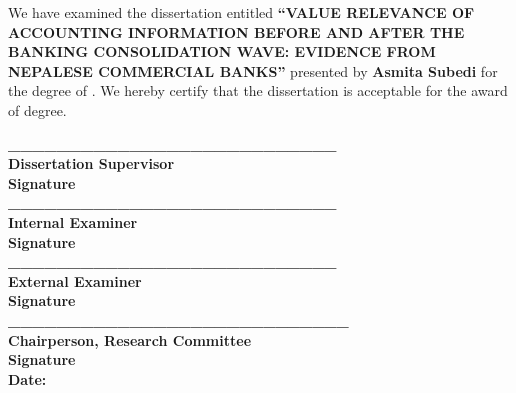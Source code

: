 \clearpage
{}
\thispagestyle{plain}

\fontsize{12}{20.76}\selectfont
We have examined the dissertation entitled \textbf{``VALUE RELEVANCE OF ACCOUNTING INFORMATION BEFORE AND AFTER THE BANKING CONSOLIDATION WAVE: EVIDENCE FROM NEPALESE COMMERCIAL BANKS''} presented by \textbf{Asmita Subedi} for the degree of \textbf{\thesisdegree}. We hereby certify that the dissertation is acceptable for the award of degree.

\vspace{2.49cm}

{\fomSignatureFont
\noindent\textbf{\_\_\_\_\_\_\_\_\_\_\_\_\_\_\_\_\_\_\_\_\_\_\_\_\_\_\_}\\
\textbf{Dissertation Supervisor}\\
\textbf{Signature}\\[26.7pt]
\textbf{\_\_\_\_\_\_\_\_\_\_\_\_\_\_\_\_\_\_\_\_\_\_\_\_\_\_\_}\\
\textbf{Internal Examiner}\\
\textbf{Signature}\\[26.7pt]
\textbf{\_\_\_\_\_\_\_\_\_\_\_\_\_\_\_\_\_\_\_\_\_\_\_\_\_\_\_}\\
\textbf{External Examiner}\\
\textbf{Signature}\\[26.7pt]
\textbf{\_\_\_\_\_\_\_\_\_\_\_\_\_\_\_\_\_\_\_\_\_\_\_\_\_\_\_\_}\\
\textbf{Chairperson, Research Committee}\\
\textbf{Signature}\\[26.7pt]
\textbf{Date:} \underline{\hspace{6.5cm}}
\par}
\singlespacing
